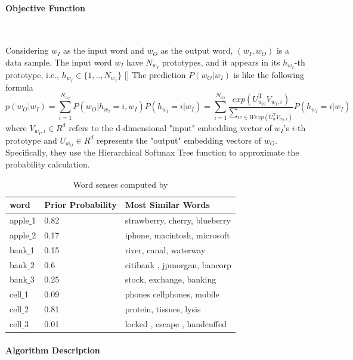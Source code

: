 \paragraph{Objective Function}\

Considering $w_I$ as the input word and $w_O$ as the output word, $(w_I,w_O)$ is a data sample. The input word $w_I$ have $N_{w_I}$ prototypes, and it appears in its $h_{w_I}$-th prototype, i.e., $h_{w_I}\in \{1,..,N_{w_I}\}$ [] The prediction $P(w_O|w_I)$ is like the following formula
$$p(w_O|w_I)=\sum^{N_{w_I}}_{i=1}P(w_O|h_{w_I}=i,w_I)P(h_{w_I}=i|w_I)=\sum^{N_{w_I}}_{i=1}\frac{exp(U^{\mathrm{T}}_{w_O}V_{w_I,i})}{\sum_{w\in W exp(U^\mathrm{T}_w V_{w_I,i})}}P(h_{w_I}=i|w_I)$$
where $V_{w_I,i}\in R^d$ refers to the d-dimensional "input" embedding vector of $w_I$'s $i$-th prototype and $U_{w_O}\in R^d$ represents the "output" embedding vectors of $w_O$. Specifically, they use the Hierarchical Softmax Tree function to approximate the probability calculation. 

\begin{table}[tb]
	\begin{center}
		\caption{Word senses computed by \citeauthor{TianDaiEtAl2014}}
		\label{tab:tian}
		\vspace{2mm}
		\begin{tabular}{|l|l|l|}
			\hline
			word & Prior Probability & Most Similar Words \\
			\hline  
			apple$\_$1 & 0.82 & strawberry, cherry, blueberry\\
			\hline
			apple$\_$2 & 0.17 & iphone, macintosh, microsoft\\
			\hline
			bank$\_$1 & 0.15 & river, canal, waterway\\
			\hline
			bank$\_$2 & 0.6 & citibank , jpmorgan, bancorp\\
			\hline
			bank$\_$3 & 0.25 & stock, exchange, banking\\
			\hline
			cell$\_$1 & 0.09 & phones cellphones, mobile\\
			\hline
			cell$\_$2 & 0.81 & protein, tissues, lysis\\
			\hline
			cell$\_$3 & 0.01 &locked , escape , handcuffed\\
			\hline
		\end{tabular}
	\end{center}
	
\end{table}

\paragraph{Algorithm Description}\ 

